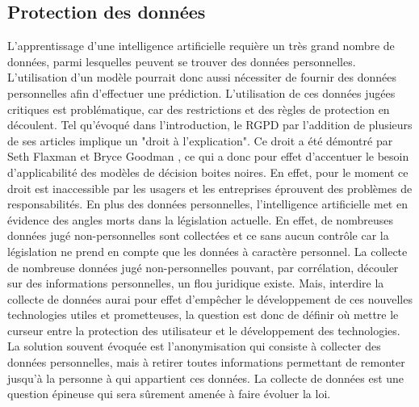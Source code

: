 \subsection{Protection des données}
L'apprentissage d'une intelligence artificielle requière un très grand nombre de données, parmi lesquelles peuvent se trouver des données personnelles. L'utilisation d'un modèle pourrait donc aussi nécessiter de fournir des données personnelles afin d'effectuer une prédiction. L'utilisation de ces données jugées critiques est problématique, car des restrictions et des règles de protection en découlent. Tel qu'évoqué dans l'introduction, le RGPD par l'addition de plusieurs de ses articles implique un "droit à l'explication". Ce droit a été démontré par Seth Flaxman et Bryce Goodman \cite{RGPDexplanRight}, ce qui a donc pour effet d'accentuer le besoin d'applicabilité des modèles de décision boites noires. En effet, pour le moment ce droit est inaccessible par les usagers et les entreprises éprouvent des problèmes de responsabilités. En plus des données personnelles, l'intelligence artificielle met en évidence des angles morts dans la législation actuelle. En effet, de nombreuses données jugé non-personnelles sont collectées et ce sans aucun contrôle car la législation ne prend en compte que les données à caractère personnel. La collecte de nombreuse données jugé non-personnelles pouvant, par corrélation, découler sur des informations personnelles, un flou juridique existe. Mais, interdire la collecte de données aurai pour effet d'empêcher le développement de ces nouvelles technologies utiles et prometteuses, la question est donc de définir où mettre le curseur entre la protection des utilisateur et le développement des technologies. La solution souvent évoquée est l'anonymisation qui consiste à collecter des données personnelles, mais à retirer toutes informations permettant de remonter jusqu'à la personne à qui appartient ces données. La collecte de données est une question épineuse qui sera sûrement amenée à faire évoluer la loi.

